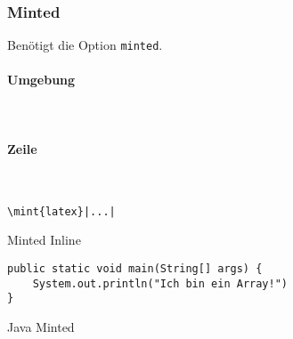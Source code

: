 \subsubsection{Minted}
Benötigt die Option \texttt{minted}.
\paragraph{Umgebung}~\\

\paragraph{Zeile}~\\
\begin{listing}[H]
\begin{verbatim}
\mint{latex}|...|
\end{verbatim}
\caption{Minted Inline}
\label{lst:minted-inline}
\end{listing}

\begin{listing}[H]
\begin{verbatim}
public static void main(String[] args) {
    System.out.println("Ich bin ein Array!")
}
\end{verbatim}
\caption{Java Minted}
\label{lst:minted-java}
\end{listing}